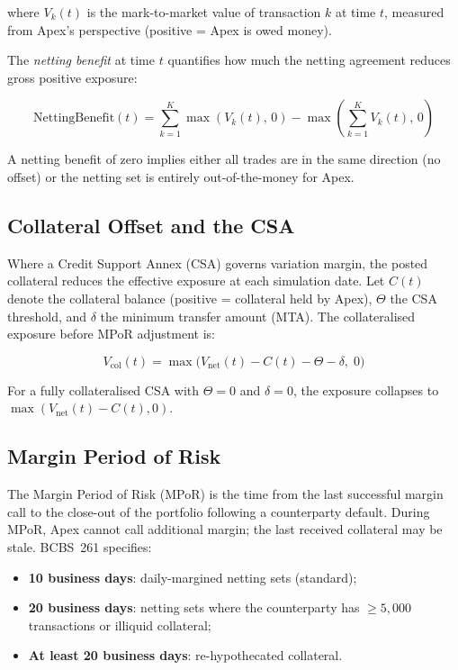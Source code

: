 \documentclass[11pt,a4paper]{article}
\begin{document}
where $V_k(t)$ is the mark-to-market value of transaction $k$ at time $t$,
measured from Apex's perspective (positive = Apex is owed money).

The \emph{netting benefit} at time $t$ quantifies how much the netting agreement
reduces gross positive exposure:

\begin{equation}
  \text{NettingBenefit}(t)
    = \sum_{k=1}^{K} \max(V_k(t),\, 0)
    - \max\!\left(\sum_{k=1}^{K} V_k(t),\, 0\right)
  \label{eq:netting_benefit}
\end{equation}

A netting benefit of zero implies either all trades are in the same direction
(no offset) or the netting set is entirely out-of-the-money for Apex.

\subsection{Collateral Offset and the CSA}

Where a Credit Support Annex (CSA) governs variation margin, the posted
collateral reduces the effective exposure at each simulation date. Let $C(t)$
denote the collateral balance (positive = collateral held by Apex), $\Theta$
the CSA threshold, and $\delta$ the minimum transfer amount (MTA). The
collateralised exposure before MPoR adjustment is:

\begin{equation}
  V_{\text{col}}(t)
    = \max\!\bigl(V_{\text{net}}(t) - C(t) - \Theta - \delta,\; 0\bigr)
  \label{eq:col_exposure}
\end{equation}

For a fully collateralised CSA with $\Theta = 0$ and $\delta = 0$, the exposure
collapses to $\max(V_{\text{net}}(t) - C(t), 0)$.

\subsection{Margin Period of Risk}

The Margin Period of Risk (MPoR) is the time from the last successful margin
call to the close-out of the portfolio following a counterparty default. During
MPoR, Apex cannot call additional margin; the last received collateral may be
stale. BCBS~261 specifies:

\begin{itemize}[noitemsep]
  \item \textbf{10 business days}: daily-margined netting sets (standard);
  \item \textbf{20 business days}: netting sets where the counterparty has
        $\geq 5{,}000$ transactions or illiquid collateral;
  \item \textbf{At least 20 business days}: re-hypothecated collateral.
\end{itemize}
\end{document}
